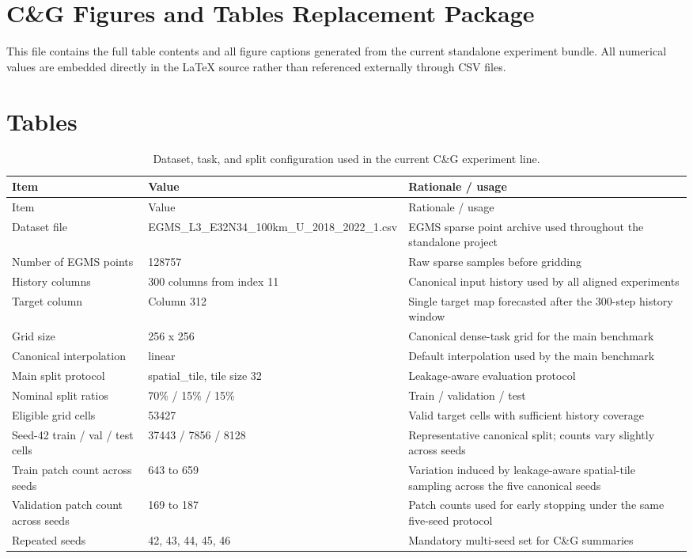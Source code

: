 \documentclass[11pt]{article}
\begin{document}
\section*{C\&G Figures and Tables Replacement Package}

This file contains the full table contents and all figure captions generated from the current standalone experiment bundle. All numerical values are embedded directly in the LaTeX source rather than referenced externally through CSV files.

\section*{Tables}

\begin{longtable}{p{3.2cm}p{3.3cm}p{7.2cm}}
\caption{Dataset, task, and split configuration used in the current C\&G experiment line.}\label{tab:t1}\\
\toprule
Item & Value & Rationale / usage \\
\midrule
\endfirsthead
\toprule
Item & Value & Rationale / usage \\
\midrule
\endhead
Dataset file & EGMS\_L3\_E32N34\_100km\_U\_2018\_2022\_1.csv & EGMS sparse point archive used throughout the standalone project \\
Number of EGMS points & 128757 & Raw sparse samples before gridding \\
History columns & 300 columns from index 11 & Canonical input history used by all aligned experiments \\
Target column & Column 312 & Single target map forecasted after the 300-step history window \\
Grid size & 256 x 256 & Canonical dense-task grid for the main benchmark \\
Canonical interpolation & linear & Default interpolation used by the main benchmark \\
Main split protocol & spatial\_tile, tile size 32 & Leakage-aware evaluation protocol \\
Nominal split ratios & 70\% / 15\% / 15\% & Train / validation / test \\
Eligible grid cells & 53427 & Valid target cells with sufficient history coverage \\
Seed-42 train / val / test cells & 37443 / 7856 / 8128 & Representative canonical split; counts vary slightly across seeds \\
Train patch count across seeds & 643 to 659 & Variation induced by leakage-aware spatial-tile sampling across the five canonical seeds \\
Validation patch count across seeds & 169 to 187 & Patch counts used for early stopping under the same five-seed protocol \\
Repeated seeds & 42, 43, 44, 45, 46 & Mandatory multi-seed set for C\&G summaries \\
\bottomrule
\end{longtable}
\end{document}
